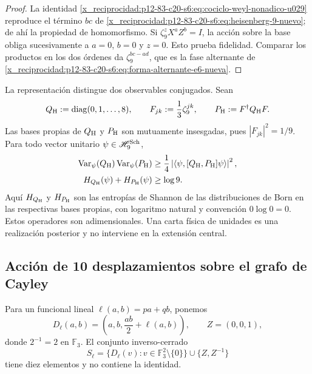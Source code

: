 \begin{proof}
La identidad \eqref{x_reciprocidad:p12-83-c20-s6:eq:cociclo-weyl-nonadico-u029} reproduce el término
\(bc\) de \eqref{x_reciprocidad:p12-83-c20-s6:eq:heisenberg-9-nuevo}; de ahí la propiedad de
homomorfismo. Si \(\zeta_9^zX^aZ^b=I\), la acción sobre la base obliga
sucesivamente a \(a=0\), \(b=0\) y \(z=0\). Esto prueba fidelidad. Comparar
los productos en los dos órdenes da
\(\zeta_9^{bc-ad}\), que es la fase alternante de
\eqref{x_reciprocidad:p12-83-c20-s6:eq:forma-alternante-e6-nueva}.
\end{proof}

La representación distingue dos observables conjugados. Sean
\[
 Q_{\rm H}:=\operatorname{diag}(0,1,\ldots,8),
 \qquad
 F_{jk}:=\frac13\zeta_9^{jk},
 \qquad
 P_{\rm H}:=F^\dagger Q_{\rm H}F.
\]
Las bases propias de \(Q_{\rm H}\) y \(P_{\rm H}\) son mutuamente
insesgadas, pues \(|F_{jk}|^2=1/9\). Para todo vector unitario
\(\psi\in\mathscr H_9^{\rm Sch}\),
\begin{align}
 \operatorname{Var}_\psi(Q_{\rm H})
 \operatorname{Var}_\psi(P_{\rm H})
 &\ge
 \frac14\left|
 \langle\psi,[Q_{\rm H},P_{\rm H}]\psi\rangle
 \right|^2,
 \label{x_reciprocidad:p12-83-c20-s6:eq:incertidumbre-weyl-u029}\\
 H_{Q_{\rm H}}(\psi)+H_{P_{\rm H}}(\psi)
 &\ge\log9.
 \label{x_reciprocidad:p12-83-c20-s6:eq:incertidumbre-entropica-weyl-u029}
\end{align}
Aquí \(H_{Q_{\rm H}}\) y \(H_{P_{\rm H}}\) son las entropías de Shannon
de las distribuciones de Born en las respectivas bases propias,
con logaritmo natural y convención \(0\log0=0\).
Estos operadores son adimensionales. Una carta física de unidades es una
realización posterior y no interviene en la extensión central.

\subsection{Acción de 10 desplazamientos sobre el grafo de Cayley}

Para un funcional lineal
\(\ell(a,b)=pa+qb\), ponemos
\[
 D_\ell(a,b)=\left(a,b,\frac{ab}{2}+\ell(a,b)\right),
 \qquad Z=(0,0,1),
\]
donde \(2^{-1}=2\) en \(\mathbb F_3\). El conjunto inverso-cerrado
\begin{equation}
 S_\ell=
 \{D_\ell(v):v\in\mathbb F_3^2\setminus\{0\}\}
 \cup\{Z,Z^{-1}\}
 \label{x_reciprocidad:p12-83-c20-s6:eq:conjunto-conexion-e6}
\end{equation}
tiene diez elementos y no contiene la identidad.

